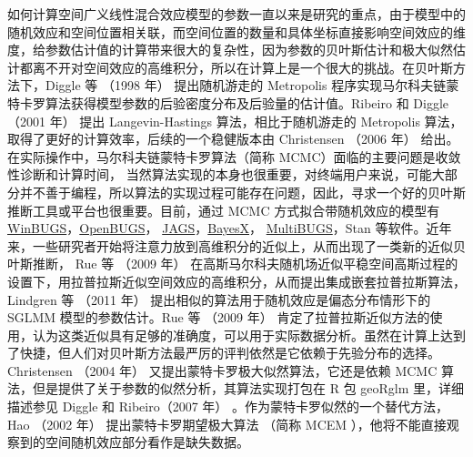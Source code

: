 \documentclass[12pt,a4paper,UTF8,twoside]{book}
\theoremstyle{definition}
\theoremstyle{definition}
\theoremstyle{definition}
\theoremstyle{remark}
\begin{document}
如何计算空间广义线性混合效应模型的参数一直以来是研究的重点，由于模型中的随机效应和空间位置相关联，而空间位置的数量和具体坐标直接影响空间效应的维度，给参数估计值的计算带来很大的复杂性，因为参数的贝叶斯估计和极大似然估计都离不开对空间效应的高维积分，所以在计算上是一个很大的挑战。在贝叶斯方法下，Diggle
等 （1998 年） \citep{Diggle1998} 提出随机游走的 Metropolis
程序实现马尔科夫链蒙特卡罗算法获得模型参数的后验密度分布及后验量的估计值。Ribeiro
和 Diggle （2001 年） \citep{geoR2001} 提出 Langevin-Hastings
算法，相比于随机游走的 Metropolis
算法，取得了更好的计算效率，后续的一个稳健版本由 Christensen （2006 年）
\citep{Christensen2006} 给出。在实际操作中，马尔科夫链蒙特卡罗算法（简称
MCMC）面临的主要问题是收敛性诊断和计算时间，
当然算法实现的本身也很重要，对终端用户来说，可能大部分并不善于编程，所以算法的实现过程可能存在问题，因此，寻求一个好的贝叶斯推断工具或平台也很重要。目前，通过
MCMC 方式拟合带随机效应的模型有
\href{http://www.mrc-bsu.cam.ac.uk/software/bugs/the-bugs-project-winbugs/}{WinBUGS}，\href{http://www.openbugs.net/}{OpenBUGS}，
\href{http://mcmc-jags.sourceforge.net/}{JAGS}，\href{http://www.BayesX.org}{BayesX}，
\href{https://www.multibugs.org}{MultiBUGS}，Stan \citep{Stan2017JSS}
等软件。近年来，一些研究者开始将注意力放到高维积分的近似上，从而出现了一类新的近似贝叶斯推断，
Rue 等 （2009 年） \citep{Rue2009}
在高斯马尔科夫随机场近似平稳空间高斯过程的设置下，用拉普拉斯近似空间效应的高维积分，从而提出集成嵌套拉普拉斯算法，Lindgren
等 （2011 年） \citep{Lindgren2011}
提出相似的算法用于随机效应是偏态分布情形下的 SGLMM 模型的参数估计。Rue
等 （2009 年） \citep{Rue2009}
肯定了拉普拉斯近似方法的使用，认为这类近似具有足够的准确度，可以用于实际数据分析。虽然在计算上达到了快捷，但人们对贝叶斯方法最严厉的评判依然是它依赖于先验分布的选择。
Christensen （2004 年） \citep{Christensen2004}
又提出蒙特卡罗极大似然算法，它还是依赖 MCMC
算法，但是提供了关于参数的似然分析，其算法实现打包在 R 包 geoRglm
里，详细描述参见 Diggle 和 Ribeiro（2007 年）
\citep{Diggle2007}。作为蒙特卡罗似然的一个替代方法， Hao （2002
年）\citep{Zhang2002On} 提出蒙特卡罗期望极大算法 （简称 MCEM
），他将不能直接观察到的空间随机效应部分看作是缺失数据。
\end{document}
